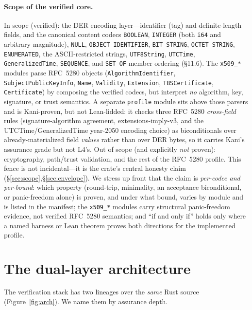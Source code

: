 \documentclass[10pt,twocolumn]{article}
\newcommand{\code}[1]{\texttt{\small #1}}
\begin{document}
\paragraph{Scope of the verified core.}
In scope (verified): the DER encoding layer---identifier (tag) and
definite-length fields, and the canonical content codecs \code{BOOLEAN},
\code{INTEGER} (both \code{i64} and arbitrary-magnitude), \code{NULL},
\code{OBJECT IDENTIFIER}, \code{BIT STRING}, \code{OCTET STRING},
\code{ENUMERATED}, the ASCII-restricted strings, \code{UTF8String},
\code{UTCTime}, \code{GeneralizedTime}, \code{SEQUENCE}, and \code{SET OF}
member ordering (\S11.6). The \code{x509\_*} modules parse RFC~5280 objects
(\code{AlgorithmIdentifier}, \code{SubjectPublicKeyInfo}, \code{Name},
\code{Validity}, \code{Extension}, \code{TBSCertificate}, \code{Certificate})
by composing the verified codecs, but interpret \emph{no} algorithm, key,
signature, or trust semantics. A separate \code{profile} module sits above
those parsers and is Kani-proven, but not Lean-lidded: it checks three
RFC~5280 \emph{cross-field} rules (signature-algorithm agreement,
extensions-imply-v3, and the UTCTime/GeneralizedTime year-2050 encoding
choice) as biconditionals over already-materialized field \emph{values}
rather than over DER bytes, so it carries Kani's assurance grade but not
L4's. Out of scope (and explicitly \emph{not}
proven): cryptography, path/trust validation, and the rest of the RFC~5280 profile.
This fence is not incidental---it is the crate's central honesty claim
(\S\ref{sec:scope},\S\ref{sec:envelope}). We stress up front that the claim is
\emph{per-codec and per-bound}: which property (round-trip, minimality, an
acceptance biconditional, or panic-freedom alone) is proven, and under what
bound, varies by module and is listed in the manifest; the \code{x509\_*}
modules carry structural panic-freedom evidence, not verified RFC~5280
semantics; and ``if and only if'' holds only where a named harness or Lean
theorem proves both directions for the implemented profile.

\section{The dual-layer architecture}
\label{sec:arch}

The verification stack has two lineages over the \emph{same} Rust source
(Figure~\ref{fig:arch}). We name them by assurance depth.
\end{document}

